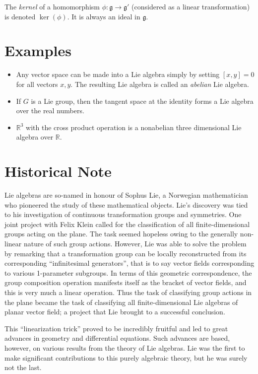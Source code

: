 \documentclass[12pt]{article}
\newcommand{\g}{\mathfrak{g}}
\begin{document}
The {\em kernel} of a homomorphism $\phi: \g \to \g'$ (considered as a linear transformation) is denoted $\ker(\phi)$. It is always an ideal in $\g$.

\section{Examples}

\begin{itemize}
\item Any vector space can be made into a Lie algebra simply by setting $[x,y] = 0$ for all vectors $x,y$. The resulting Lie algebra is called an {\em abelian} Lie algebra.
\item If $G$ is a Lie group, then the tangent space at the identity forms a Lie algebra over the real numbers.
\item $\mathbb{R}^3$ with the cross product operation is a nonabelian three dimensional Lie algebra over $\mathbb{R}$.
\end{itemize}

\section{Historical Note}
Lie algebras are so-named in honour of Sophus Lie, a Norwegian
mathematician who pioneered the study of these mathematical objects.
Lie's discovery was tied to his investigation of continuous
transformation groups and symmetries.  One joint project with Felix
Klein called for the classification of all finite-dimensional groups
acting on the plane.  The task seemed hopeless owing to the generally
non-linear nature of such group actions.  However, Lie was able to
solve the problem by remarking that a transformation group can be
locally reconstructed from its corresponding ``infinitesimal
generators'', that is to say vector fields corresponding to various
1-parameter subgroups.  In terms of this geometric correspondence, the
group composition operation manifests itself as the bracket of vector
fields, and this is very much a linear operation.  Thus the task of
classifying group actions in the plane became the task of classifying
all finite-dimensional Lie algebras of planar vector field; a project
that Lie brought to a successful conclusion.

This ``linearization trick'' proved to be incredibly fruitful and led
to great advances in geometry and differential equations.  Such
advances are based, however, on various results from the theory of  Lie
algebras.   Lie was the first to make significant contributions to this
purely algebraic theory, but he was surely not the last.
\end{document}
